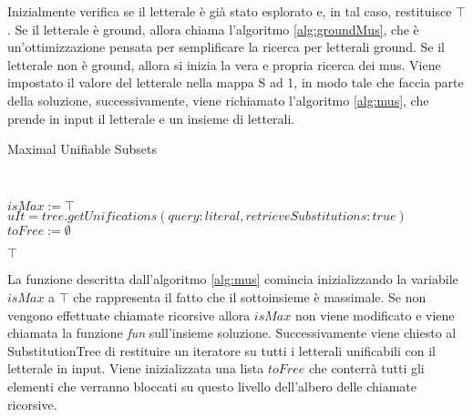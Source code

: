 \documentclass[./main.tex]{subfiles}
\begin{document}
Inizialmente verifica se il letterale è già stato esplorato e, in tal caso, restituisce $\top$.
Se il letterale è ground, allora chiama l'algoritmo \ref{alg:groundMus}, che è un'ottimizzazione pensata 
per semplificare la ricerca per letterali ground.
Se il letterale non è ground, allora si inizia la vera e propria ricerca dei mus.
Viene impostato il valore del letterale nella mappa S ad 1, in modo tale che faccia parte della soluzione,
successivamente, viene richiamato l'algoritmo \ref{alg:mus},
che prende in input il letterale e un insieme di letterali.


\begin{algorithm}[H] \label{alg:mus}
    \small
    \caption{Maximal Unifiable Subsets}
    \\

$isMax := \top$\;
$uIt = tree.getUnifications(query: literal, retrieveSubstitutions: true)$\;
$toFree := \emptyset$\;

\Return $\top$\;
\end{algorithm}

La funzione descritta dall'algoritmo \ref{alg:mus} comincia inizializzando la variabile $isMax$ a $\top$ che rappresenta il fatto che il sottoinsieme è massimale.
Se non vengono effettuate chiamate ricorsive allora $isMax$ non viene modificato
e viene chiamata la funzione \textit{fun} sull'insieme soluzione.
Successivamente viene chiesto al SubstitutionTree di restituire un iteratore
su tutti i letterali unificabili con il letterale in input.
Viene inizializzata una lista $toFree$ che conterrà tutti gli elementi che 
verranno bloccati su questo livello dell'albero delle chiamate ricorsive.
\end{document}
